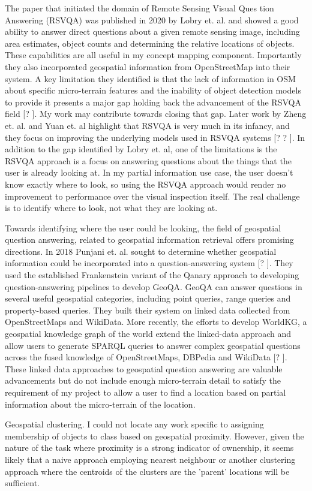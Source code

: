 The paper that initiated the domain of Remote Sensing Visual Ques tion Answering (RSVQA) was published in 2020 by Lobry et. al. and showed a good ability to answer direct questions about a given
remote sensing image, including area estimates, object counts and
determining the relative locations of objects. 
These capabilities are all useful in my concept mapping component. 
Importantly they also incorporated geospatial information from OpenStreetMap into
their system. 
A key limitation they identified is that the lack of information in OSM about specific micro-terrain features and the inability of object detection models to provide it presents a major gap holding back the advancement of the RSVQA field [? ]. 
My work may contribute towards closing that gap. Later work by Zheng et. al. and Yuan et. al highlight that RSVQA is very much in its infancy, and they focus on improving the underlying models used in RSVQA systems [? ? ].
In addition to the gap identified by Lobry et. al, one of the limitations is the RSVQA approach is a focus on answering questions about the things that the user is already looking at. 
In my partial information use case, the user doesn’t know exactly where to look, so using the RSVQA approach would render no improvement to performance over the visual inspection itself. 
The real challenge is to identify where to look, not what they are looking at.

Towards identifying where the user could be looking, the field of geospatial question answering, related to geospatial information retrieval offers promising directions. 
In 2018 Punjani et. al. sought to determine whether geospatial information could be incorporated into a question-answering system [? ]. 
They used the established Frankenstein variant of the Qanary approach to developing question-answering pipelines to develop GeoQA. 
GeoQA can answer questions in several useful geospatial categories, including point queries, range queries and property-based queries. 
They built their system on linked data collected from OpenStreetMaps and WikiData. 
More recently, the efforts to develop WorldKG, a geospatial knowledge graph of the world extend the linked-data approach and allow users to generate SPARQL queries to answer complex geospatial questions across the fused knowledge of OpenStreetMaps, DBPedia and WikiData [? ]. 
These linked data approaches to geospatial question answering are valuable advancements but do not include enough micro-terrain detail to satisfy the requirement of my project to allow a user to find a location based on partial information about the micro-terrain of the location.

Geospatial clustering. I could not locate any work specific to assigning membership of objects to class based on geospatial proximity. 
However, given the nature of the task where proximity is a strong indicator of ownership, it seems likely that a naive approach employing nearest neighbour or another clustering approach where the centroids of the clusters are the ’parent’ locations will be sufficient.
